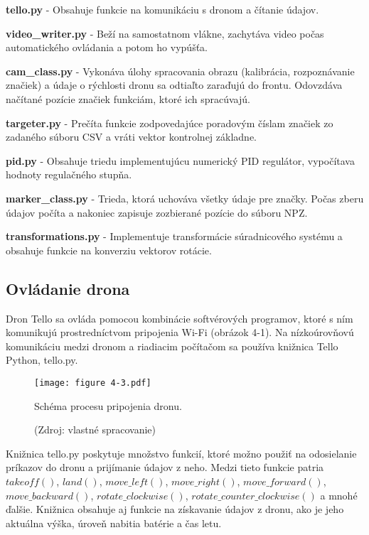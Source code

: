     \textbf{tello.py} - Obsahuje funkcie na komunikáciu s dronom a čítanie údajov.

    \textbf{video\_writer.py} - Beží na samostatnom vlákne, zachytáva video počas automatického ovládania a potom ho vypúšťa.

    \textbf{cam\_class.py} - Vykonáva úlohy spracovania obrazu (kalibrácia, rozpoznávanie značiek) a údaje o rýchlosti dronu sa odtiaľto zaraďujú do frontu. Odovzdáva načítané pozície značiek funkciám, ktoré ich spracúvajú.

    \textbf{targeter.py} - Prečíta funkcie zodpovedajúce poradovým číslam značiek zo zadaného súboru CSV a vráti vektor kontrolnej základne.

    \textbf{pid.py} - Obsahuje triedu implementujúcu numerický PID regulátor, vypočítava hodnoty regulačného stupňa.

    \textbf{marker\_class.py} - Trieda, ktorá uchováva všetky údaje pre značky. Počas zberu údajov počíta a nakoniec zapisuje zozbierané pozície do súboru NPZ.
 
    \textbf{transformations.py} - Implementuje transformácie súradnicového systému a obsahuje funkcie na konverziu vektorov rotácie.

 
\subsection{Ovládanie drona}
Dron Tello sa ovláda pomocou kombinácie softvérových programov, ktoré s ním komunikujú prostredníctvom pripojenia Wi-Fi (obrázok 4-1). Na nízkoúrovňovú komunikáciu medzi dronom a riadiacim počítačom sa používa knižnica Tello Python, tello.py.

\begin{figure}[ht!]
    \centering
    \texttt{[image: figure 4-3.pdf]}
    \caption{Schéma procesu pripojenia dronu.}
    \captionsetup{font=footnotesize, justification=centering, skip=5pt}
    \caption*{(Zdroj: vlastné spracovanie)}
    \label{o:4-3} 
\end{figure}  

Knižnica tello.py poskytuje množstvo funkcií, ktoré možno použiť na odosielanie príkazov do dronu a prijímanie údajov z neho. Medzi tieto funkcie patria 
$takeoff()$, $land()$, $move\_left()$, $move\_right()$, $move\_forward()$, $move\_backward()$, \break $rotate\_clockwise()$, $rotate\_counter\_clockwise()$ 
a mnohé ďalšie. Knižnica obsahuje aj funkcie na získavanie údajov z dronu, ako je jeho aktuálna výška, úroveň nabitia batérie a čas letu.

